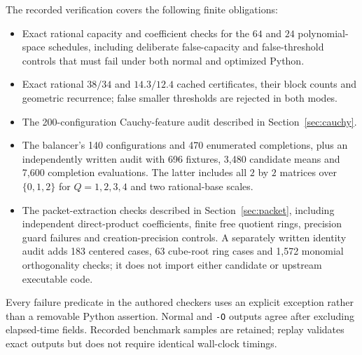 The recorded verification covers the following finite obligations:
\begin{itemize}
\item Exact rational capacity and coefficient checks for the $64$ and $24$ polynomial-space schedules, including deliberate false-capacity and false-threshold controls that must fail under both normal and optimized Python.
\item Exact rational $38/34$ and $14.3/12.4$ cached certificates, their block counts and geometric recurrence; false smaller thresholds are rejected in both modes.
\item The 200-configuration Cauchy-feature audit described in Section~\ref{sec:cauchy}.
\item The balancer's 140 configurations and 470 enumerated completions, plus an independently written audit with 696 fixtures, 3,480 candidate means and 7,600 completion evaluations. The latter includes all $2$ by $2$ matrices over $\{0,1,2\}$ for $Q=1,2,3,4$ and two rational-base scales.
\item The packet-extraction checks described in Section~\ref{sec:packet}, including independent direct-product coefficients, finite free quotient rings, precision guard failures and creation-precision controls. A separately written identity audit adds 183 centered cases, 63 cube-root ring cases and 1,572 monomial orthogonality checks; it does not import either candidate or upstream executable code.
\end{itemize}
Every failure predicate in the authored checkers uses an explicit exception rather than a removable Python assertion. Normal and \texttt{-O} outputs agree after excluding elapsed-time fields. Recorded benchmark samples are retained; replay validates exact outputs but does not require identical wall-clock timings.
